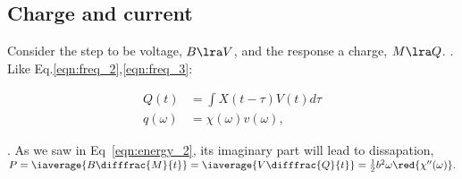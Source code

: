   
%  
%  
%  

 \subsection{Charge and current}
  Consider the step to be voltage, $ B \lra V $, and the response a charge, $ M \lra Q $. \textbf{}. Like Eq.\eqref{eqn:freq_2},\eqref{eqn:freq_3}:
  
  \begin{equation}\label{key}
  \begin{aligned}
  	Q(t) & = \int X(t-\tau)V(t)d\tau\\
  	q(\omega) & = \chi(\omega)v(\omega),
  \end{aligned}
  \end{equation}
  
  \noindent {}. As we saw in Eq~\eqref{eqn:energy_2}, its imaginary part will lead to dissapation, $ P =\iaverage{B\difffrac{M}{t}} = \iaverage{V\difffrac{Q}{t} }= \frac{1}{2}b^2\omega\red{\chi''(\omega)}. $
  
